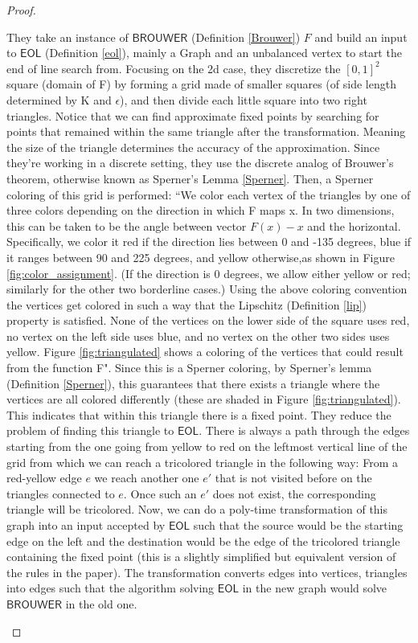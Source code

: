 \documentclass[11pt]{article}
\newcommand{\eol}{\mathsf{EOL}}
\begin{document}
\begin{proof}
\begin{enumerate}
            
            They take an instance of $\mathsf{BROUWER}$ (Definition \ref{Brouwer}) $F$  and build an input to $\eol$ (Definition \ref{eol}), mainly a Graph and an unbalanced vertex to start the end of line search from. Focusing on the 2d case, they discretize the $[0,1]^2$ square (domain of F) by forming a grid made of smaller squares (of side length determined by K and $\epsilon$),  and  then  divide  each little square into two right triangles. Notice that we can find approximate fixed points by searching for points that remained within the same triangle after the transformation. Meaning the size of the triangle determines the accuracy of the approximation. Since they're working in a discrete setting, they use the discrete analog of Brouwer's theorem, otherwise known as Sperner's Lemma \ref{Sperner}. Then, a Sperner coloring of this grid is performed: ``We  color  each  vertex of  the  triangles  by  one  of  three colors  depending  on  the direction in  which F maps x. In two dimensions, this can be taken to be the angle between vector $F(x)-x$ and the horizontal.  Specifically, we color it red if the direction lies between 0 and -135 degrees, blue if it ranges between 90 and 225 degrees, and yellow otherwise,as shown in Figure \ref{fig:color_assignment}.  (If the direction is 0 degrees, we allow either yellow or red;  similarly for the other two borderline cases.)  Using the above coloring convention the vertices get colored in such a way that the Lipschitz (Definition \ref{lip}) property is satisfied. None of the vertices on the lower side of the square uses red, no vertex on the left side uses blue, and no vertex on the other two sides uses yellow. Figure \ref{fig:triangulated} shows a coloring of the vertices that could result from the function F". Since this is a Sperner coloring, by Sperner's lemma (Definition \ref{Sperner}), this guarantees that there exists a triangle where the vertices are all colored differently (these are shaded in Figure \ref{fig:triangulated}). This indicates that within this triangle there is a fixed point. They reduce the problem of finding this triangle to $\eol$. There is always a path through the edges starting from the one going from yellow to red on the leftmost vertical line of the grid from which we can reach a tricolored triangle in the following way: From a red-yellow edge $e$ we reach another one $e'$ that is not visited before on the triangles connected to $e$. Once such an $e'$ does not exist, the corresponding triangle will be tricolored. Now, we can do a poly-time transformation of this graph into an input accepted by $\eol$ such that the source would be the starting edge on the left and the destination would be the edge of the tricolored triangle containing the fixed point (this is a slightly simplified but equivalent version of the rules in the paper). The transformation converts edges into vertices, triangles into edges such that the algorithm solving $\eol$ in the new graph would solve $\mathsf{BROUWER}$ in the old one.
        

\end{enumerate}
\end{proof}
\end{document}
